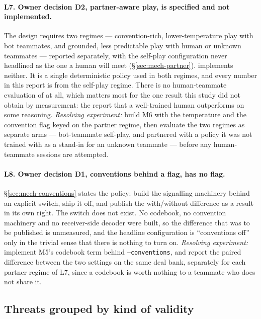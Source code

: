 \paragraph{L7. Owner decision D2, partner-aware play, is specified and not
implemented.} The design requires two regimes --- convention-rich,
lower-temperature play with bot teammates, and grounded, less predictable play
with human or unknown teammates --- reported separately, with the self-play
configuration never headlined as the one a human will meet
(\S\ref{sec:mech-partner}). \vfive{} implements neither. It is a single
deterministic policy used in both regimes, and every number in this report is
from the self-play regime. There is no human-teammate evaluation of \vfive{} at
all, which matters most for the one result this study did not obtain by
measurement: the report that a well-trained human outperforms \vfour{} on some
reasoning. \emph{Resolving experiment:} build M6 with the temperature and the
convention flag keyed on the partner regime, then evaluate the two regimes as
separate arms --- bot-teammate self-play, and \vfive{} partnered with a policy it
was not trained with as a stand-in for an unknown teammate --- before any
human-teammate sessions are attempted.

\paragraph{L8. Owner decision D1, conventions behind a flag, has no flag.}
\S\ref{sec:mech-conventions} states the policy: build the signalling machinery
behind an explicit switch, ship it off, and publish the with/without difference
as a result in its own right. The switch does not exist. No codebook, no
convention machinery and no receiver-side decoder were built, so the difference
that was to be published is unmeasured, and the headline configuration is
``conventions off'' only in the trivial sense that there is nothing to turn on.
\emph{Resolving experiment:} implement M5's codebook term behind
\texttt{--conventions}, and report the paired difference between the two settings
on the same deal bank, separately for each partner regime of L7, since a
codebook is worth nothing to a teammate who does not share it.

\subsection{Threats grouped by kind of validity}
\label{sec:lim-validity}

